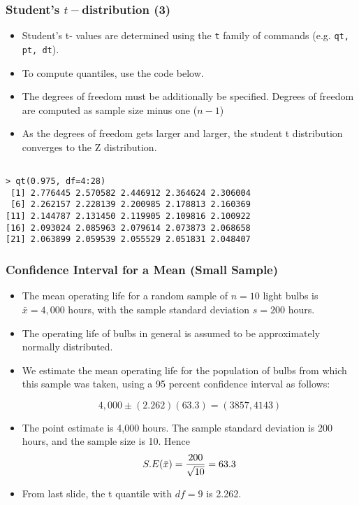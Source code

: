 \documentclass[a4]{beamer}
\begin{document}
\begin{frame}[fragile]
\frametitle{Student's $t-$distribution (3)}

\begin{itemize}
\item Student's t- values are determined using the \texttt{t} family of commands (e.g. \texttt{qt, pt, dt}).
\item To compute quantiles, use the code below.
\item The degrees of freedom must be additionally be specified. Degrees of freedom are computed as sample size minus one ($n-1$)
\item As the degrees of freedom gets larger and larger, the student t distribution converges to the Z distribution.

\end{itemize}
\begin{verbatim}

> qt(0.975, df=4:28)
 [1] 2.776445 2.570582 2.446912 2.364624 2.306004
 [6] 2.262157 2.228139 2.200985 2.178813 2.160369
[11] 2.144787 2.131450 2.119905 2.109816 2.100922
[16] 2.093024 2.085963 2.079614 2.073873 2.068658
[21] 2.063899 2.059539 2.055529 2.051831 2.048407
\end{verbatim}
\end{frame}
\begin{frame}
\frametitle{Confidence Interval for a Mean (Small Sample)}
\begin{itemize}
\item The mean operating life for a random sample of $n = 10$ light bulbs is $\bar{x} = 4,000$ hours, with the sample
standard deviation $s = 200$ hours. \item The operating life of bulbs in general is assumed to be approximately normally distributed.\item
We estimate the mean operating life for the population of bulbs from which this sample was taken, using a 95 percent
confidence interval as follows:

\[4,000\pm(2.262)(63.3)  = (3857,4143)\]

\item The point estimate is 4,000 hours. The sample standard deviation is 200 hours, and the sample size is 10. Hence \[S.E(\bar{x} ) = { 200 \over \sqrt{10}} = 63.3\]

\item From last slide, the t quantile with $df=9$ is 2.262.
\end{itemize}
\end{frame}
\end{document}

